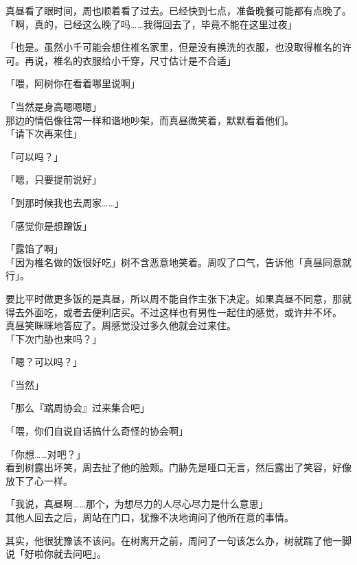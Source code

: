 真昼看了眼时间，周也顺着看了过去。已经快到七点，准备晚餐可能都有点晚了。\\

「啊，真的，已经这么晚了吗……我得回去了，毕竟不能在这里过夜」

「也是。虽然小千可能会想住椎名家里，但是没有换洗的衣服，也没取得椎名的许可。再说，椎名的衣服给小千穿，尺寸估计是不合适」

「喂，阿树你在看着哪里说啊」

「当然是身高嗯嗯嗯」\\

那边的情侣像往常一样和谐地吵架，而真昼微笑着，默默看着他们。\\

「请下次再来住」

「可以吗？」

「嗯，只要提前说好」

「到那时候我也去周家……」

「感觉你是想蹭饭」

「露馅了啊」\\

「因为椎名做的饭很好吃」树不含恶意地笑着。周叹了口气，告诉他「真昼同意就行」。

要比平时做更多饭的是真昼，所以周不能自作主张下决定。如果真昼不同意，那就得去外面吃，或者去便利店买。不过这样也有男性一起住的感觉，或许并不坏。\\

真昼笑眯眯地答应了。周感觉没过多久他就会过来住。\\

「下次门胁也来吗？」

「嗯？可以吗？」

「当然」

「那么『踹周协会』过来集合吧」

「喂，你们自说自话搞什么奇怪的协会啊」

「你想……对吧？」\\

看到树露出坏笑，周去扯了他的脸颊。门胁先是哑口无言，然后露出了笑容，好像放下了心一样。\\

\vspace{2\baselineskip}

「我说，真昼啊……那个，为想尽力的人尽心尽力是什么意思」\\

其他人回去之后，周站在门口，犹豫不决地询问了他所在意的事情。

其实，他很犹豫该不该问。在树离开之前，周问了一句该怎么办，树就踹了他一脚说「好啦你就去问吧」。

